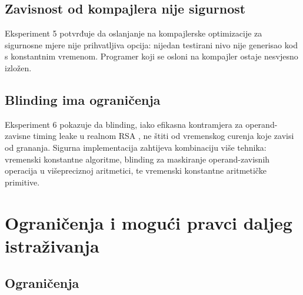 \subsection{Zavisnost od kompajlera nije sigurnost}
Eksperiment 5 potvrđuje da oslanjanje na kompajlerske optimizacije za sigurnosne mjere nije prihvatljiva opcija: nijedan testirani nivo nije generisao kod s konstantnim vremenom. Programer koji se osloni na kompajler ostaje nesvjesno izložen.

\subsection{Blinding ima ograničenja}
Eksperiment 6 pokazuje da blinding, iako efikasna kontramjera za operand-zavisne timing leake u realnom RSA \cite{brumley2003}, ne štiti od vremenskog curenja koje zavisi od grananja. Sigurna implementacija zahtijeva kombinaciju više tehnika: vremenski konstantne algoritme, blinding za maskiranje operand-zavisnih operacija u višepreciznoj aritmetici, te vremenski konstantne aritmetičke primitive.

\section{Ograničenja i mogući pravci daljeg istraživanja}

\subsection{Ograničenja}

